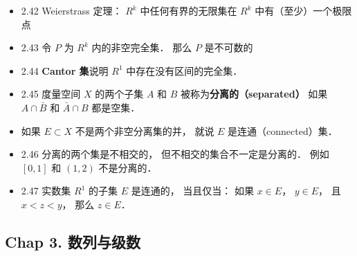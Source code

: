 \begin{itemize}
\item 2.42 Weierstrass 定理： $R^k$ 中任何有界的无限集在 $R^k$ 中有（至少）一个极限点

\item 2.43 令 $P$ 为 $R^k$ 内的非空完全集． 那么 $P$ 是不可数的

\item 2.44 \textbf{Cantor 集}说明 $R^1$ 中存在没有区间的完全集．

\item 2.45 度量空间 $X$ 的两个子集 $A$ 和 $B$ 被称为\textbf{分离的（separated）} 如果 $A \cap \bar B$ 和 $\bar A \cap B$ 都是空集．

\item 如果 $E \subset X$ 不是两个非空分离集的并， 就说 $E$ 是连通（connected）集．

\item 2.46 分离的两个集是不相交的， 但不相交的集合不一定是分离的． 例如 $[0,1]$ 和 $(1,2)$ 不是分离的．

\item 2.47 实数集 $R^1$ 的子集 $E$ 是连通的， 当且仅当： 如果 $x\in E$， $y\in E$， 且 $x < z < y$， 那么 $z \in E$．
\end{itemize}

\subsection{Chap 3. 数列与级数}


